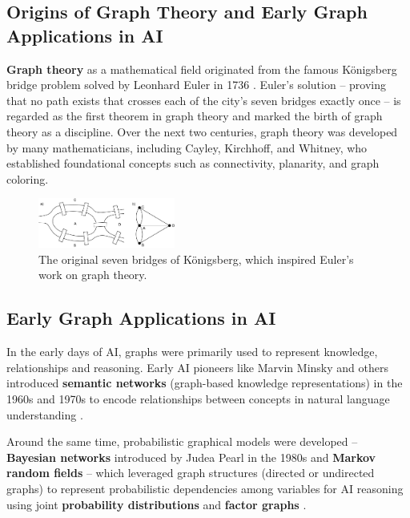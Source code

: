 \documentclass{article}
\begin{document}
\subsection{Origins of Graph Theory and Early Graph Applications in AI}

\textbf{Graph theory} as a mathematical field originated from the famous Königsberg bridge problem solved by Leonhard Euler in 1736 \cite{carlson2019konigsberg}.
Euler’s solution – proving that no path exists that crosses each of the city’s seven bridges exactly once – is regarded as the first theorem in graph theory and marked the birth of graph theory as a discipline.
Over the next two centuries, graph theory was developed by many mathematicians, including Cayley, Kirchhoff, and Whitney, who established foundational concepts such as connectivity, planarity, and graph coloring.

\begin{figure}[ht]
      \centering
      \includegraphics[width=0.4\textwidth]{../assets/konigsberg-bridges.png}
      \caption{The original seven bridges of Königsberg, which inspired Euler's work on graph theory.}
      \label{fig:konigsberg-bridges}
\end{figure}

\subsection{Early Graph Applications in AI}

In the early days of AI, graphs were primarily used to represent knowledge, relationships and reasoning.
Early AI pioneers like Marvin Minsky and others introduced \textbf{semantic networks} (graph-based knowledge representations) in the 1960s and 1970s to encode relationships between concepts in natural language understanding \cite{kelemen2007neural}.

Around the same time, probabilistic graphical models were developed – \textbf{Bayesian networks} introduced by Judea Pearl in the 1980s \cite{pearl1995bayesian} and \textbf{Markov random fields} \cite{lang2024abstract} – which leveraged graph structures (directed or undirected graphs) to represent probabilistic dependencies among variables for AI reasoning using joint \textbf{probability distributions} and \textbf{factor graphs} \cite{loeliger2004factor}.
\end{document}
